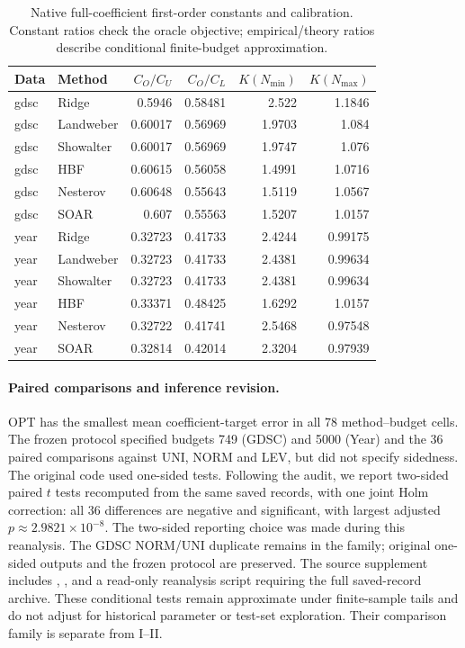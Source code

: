\documentclass[11pt,a4paper,leqno]{article}
\numberwithin{equation}{section}
\numberwithin{figure}{section}
\numberwithin{table}{section}
\theoremstyle{plain}
\theoremstyle{definition}
\theoremstyle{remark}
\begin{document}
\begin{table}[!htbp]\centering\small
\setlength{\tabcolsep}{4pt}
\caption{Native full-coefficient first-order constants and calibration. Constant ratios check the oracle objective; empirical/theory ratios describe conditional finite-budget approximation.}
\label{tab:real_calibration}
\begin{tabular}{llrrrr}\toprule
Data & Method & $C_O/C_U$ & $C_O/C_L$ & $K(N_{\min})$ & $K(N_{\max})$ \\\midrule
gdsc & Ridge & 0.5946 & 0.58481 & 2.522 & 1.1846 \\
gdsc & Landweber & 0.60017 & 0.56969 & 1.9703 & 1.084 \\
gdsc & Showalter & 0.60017 & 0.56969 & 1.9747 & 1.076 \\
gdsc & HBF & 0.60615 & 0.56058 & 1.4991 & 1.0716 \\
gdsc & Nesterov & 0.60648 & 0.55643 & 1.5119 & 1.0567 \\
gdsc & SOAR & 0.607 & 0.55563 & 1.5207 & 1.0157 \\
year & Ridge & 0.32723 & 0.41733 & 2.4244 & 0.99175 \\
year & Landweber & 0.32723 & 0.41733 & 2.4381 & 0.99634 \\
year & Showalter & 0.32723 & 0.41733 & 2.4381 & 0.99634 \\
year & HBF & 0.33371 & 0.48425 & 1.6292 & 1.0157 \\
year & Nesterov & 0.32722 & 0.41741 & 2.5468 & 0.97548 \\
year & SOAR & 0.32814 & 0.42014 & 2.3204 & 0.97939 \\
\bottomrule\end{tabular}
\end{table}


\paragraph{Paired comparisons and inference revision.}
\label{supp:subsec:real_inference_revision}
OPT has the smallest mean coefficient-target error in all 78 method--budget
cells. The frozen protocol specified budgets 749 (GDSC) and 5000 (Year)
and the 36 paired comparisons against UNI, NORM and LEV, but did not
specify sidedness. The original code used one-sided tests. Following the
audit, we report two-sided paired $t$ tests recomputed from the same saved
records, with one joint Holm correction: all 36 differences are negative
and significant, with largest adjusted $p\approx2.9821\times10^{-8}$.
The two-sided reporting choice was made during this reanalysis.
The GDSC NORM/UNI duplicate remains in the family; original one-sided
outputs and the frozen protocol are preserved. The source supplement
includes ,
, and a read-only reanalysis script
requiring the full saved-record archive. These conditional tests remain
approximate under finite-sample tails and do not adjust for historical
parameter or test-set exploration. Their comparison family is separate from I--II.
\end{document}
